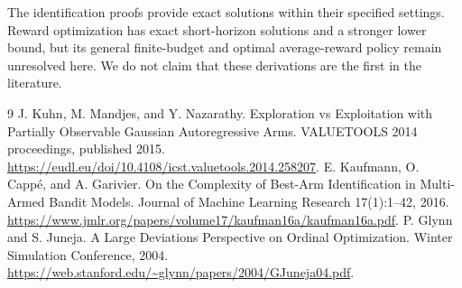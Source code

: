 \documentclass[11pt]{article}
\begin{document}
The identification proofs provide exact solutions within their specified settings. Reward optimization has exact short-horizon solutions and a stronger lower bound, but its general finite-budget and optimal average-reward policy remain unresolved here. We do not claim that these derivations are the first in the literature.

\begin{thebibliography}{9}
 J. Kuhn, M. Mandjes, and Y. Nazarathy. Exploration vs Exploitation with Partially Observable Gaussian Autoregressive Arms. VALUETOOLS 2014 proceedings, published 2015. \url{https://eudl.eu/doi/10.4108/icst.valuetools.2014.258207}.
 E. Kaufmann, O. Capp\'e, and A. Garivier. On the Complexity of Best-Arm Identification in Multi-Armed Bandit Models. Journal of Machine Learning Research 17(1):1--42, 2016. \url{https://www.jmlr.org/papers/volume17/kaufman16a/kaufman16a.pdf}.
 P. Glynn and S. Juneja. A Large Deviations Perspective on Ordinal Optimization. Winter Simulation Conference, 2004. \url{https://web.stanford.edu/~glynn/papers/2004/GJuneja04.pdf}.
\end{thebibliography}
\end{document}
